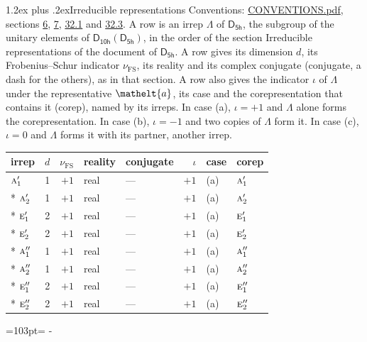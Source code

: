 \documentclass[10pt,a4paper]{article}
\makeatletter
\renewcommand\section{\@startsection{section}{1}{\z@}{-3ex plus -1ex minus -.2ex}%
  {1.2ex plus .2ex}{\normalfont\large\sffamily\bfseries\color{parttitle}}}
\newcommand{\needspace}[1]{\par\penalty-100\begingroup\dimen0=#1\relax\dimen2=\pagegoal
  \advance\dimen2-\pagetotal\ifdim\dimen0>\dimen2\relax\ifdim\dimen2>0pt\vfil\break\fi\fi
  \endgroup}
\numberwithin{equation}{section}
\newcommand{\eltfont}[1]{{\let\sigma\eltsigma\mathelt{#1}}}
\newcommand{\grp}[1]{\mathsf{#1}}
\newcommand{\irr}[1]{\text{\normalfont\scshape #1}}
\newcommand{\elt}[1]{\eltfont{#1}}
\newcommand{\fsind}{\nu_{\mathrm{FS}}}
\makeatother
\begin{document}
\section{Irreducible representations}\label{s:irreps}
Conventions: \href{../../CONVENTIONS.pdf}{CONVENTIONS.pdf}, sections \href{../../../rotation/CONVENTIONS.pdf\#conv.6}{6}, \href{../../../rotation/CONVENTIONS.pdf\#conv.7}{7}, \href{../../CONVENTIONS.pdf\#conv.32.1}{32.1} and \href{../../CONVENTIONS.pdf\#conv.32.3}{32.3}.
\leavevmode\label{n:irrep.Delta}A row is an irrep $\Lambda$ of $\grp{D_{5h}}$, the subgroup of the unitary elements of $\grp{D_{10h}}(\grp{D_{5h}})$, in the order of the section Irreducible representations of the document of \href{../../../rotation/data/pdf/D5h.pdf}{$\grp{D_{5h}}$}. \label{n:index.dimension}\label{n:index.frobenius}\label{n:head.irrep}\label{n:head.reality}\label{n:head.conjugate}A row gives its dimension $d$, its Frobenius--Schur indicator $\fsind$, its reality and its complex conjugate (conjugate, a dash for the others), as in that section. \label{n:head.case.corep}\label{n:head.corep}A row also gives the indicator $\iota$ of $\Lambda$ under the representative $\elt{a}$, its case and the corepresentation that contains it (corep), named by its irreps. In case (a), $\iota = +1$ and $\Lambda$ alone forms the corepresentation. In case (b), $\iota = -1$ and two copies of $\Lambda$ form it. In case (c), $\iota = 0$ and $\Lambda$ forms it with its partner, another irrep.
\setlength{\emergencystretch}{2em}\par\setlength{\emergencystretch}{0pt}
{\small\renewcommand{\arraystretch}{1.25}\setlength{\tabcolsep}{4pt}\begin{longtable}{@{}lrrllrll@{}}\toprule
irrep & $d$ & $\fsind$ & reality & conjugate & $\iota$ & case & corep\\\midrule\endhead
\bottomrule\endfoot\endlastfoot
$\irr{a}_{1}'$ & 1 & $+1$ & real & --- & $+1$ & (a) & $\irr{a}_{1}'$\\*
$\irr{a}_{2}'$ & 1 & $+1$ & real & --- & $+1$ & (a) & $\irr{a}_{2}'$\\*
$\irr{e}_{1}'$ & 2 & $+1$ & real & --- & $+1$ & (a) & $\irr{e}_{1}'$\\*
$\irr{e}_{2}'$ & 2 & $+1$ & real & --- & $+1$ & (a) & $\irr{e}_{2}'$\\*
$\irr{a}_{1}''$ & 1 & $+1$ & real & --- & $+1$ & (a) & $\irr{a}_{1}''$\\*
$\irr{a}_{2}''$ & 1 & $+1$ & real & --- & $+1$ & (a) & $\irr{a}_{2}''$\\*
$\irr{e}_{1}''$ & 2 & $+1$ & real & --- & $+1$ & (a) & $\irr{e}_{1}''$\\*
$\irr{e}_{2}''$ & 2 & $+1$ & real & --- & $+1$ & (a) & $\irr{e}_{2}''$\\
\bottomrule\end{longtable}}
\needspace{103pt}
\end{document}
